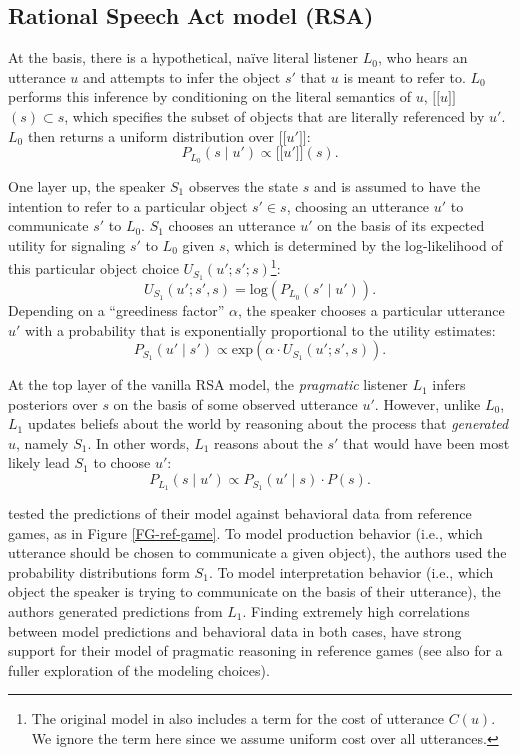 \documentclass[10pt,a4paper]{article}
\newcommand{\sem}[1]{\mbox{$[\![$#1$]\!]$}}
\begin{document}
\subsection{Rational Speech Act model (RSA)}


At the basis, there is a hypothetical, na\"ive literal listener $L_0$, who hears an utterance $u$ and attempts to infer the object $s'$ that $u$ is meant to refer to.
$L_0$ performs this inference by conditioning on the literal semantics of $u$, \sem{$u$}$(s)\subset s$, which specifies the subset of objects that are literally referenced by $u'$. 
$L_0$ then returns a uniform distribution over \sem{$u'$}:
$$P_{L_{0}}(s\mid u') \propto \sem{$u'$}(s).$$

One layer up, the speaker $S_1$ observes the state $s$ and is assumed to have the intention to refer to a particular object $s' \in s$, choosing an utterance $u'$ to communicate $s'$ to $L_0$.
$S_1$ chooses an utterance $u'$ on the basis of its expected utility for signaling $s'$ to $L_0$ given $s$, which is determined by the log-likelihood of this particular object choice $U_{S_1}(u';s';s)$\footnote{The original model in  also includes a term for the cost of utterance $C(u)$. We ignore the term here since we assume uniform cost over all utterances.}:
$$U_{S_{1}}(u';s',s) = \textrm{log}(P_{L_{0}}(s' \mid u')).$$ 
Depending on a ``greediness factor'' $\alpha$, the speaker chooses a particular utterance $u'$ with a probability that is exponentially proportional to the utility estimates: 
$$P_{S_{1}} (u' \mid s') \propto   \textrm{exp}(\alpha \cdot U_{S_{1}} (u';s',s)).$$

At the top layer of the vanilla RSA model, the \emph{pragmatic} listener $L_1$ infers posteriors over $s$ on the basis of some observed utterance $u'$.
However, unlike $L_0$, $L_1$ updates beliefs about the world by reasoning about the process that \emph{generated} $u$, namely $S_1$.
In other words, $L_1$ reasons about the $s'$ that would have been most likely lead $S_1$ to choose $u'$:
$$P_{L_{1}}(s\mid u') \propto P_{S_{1}}(u' \mid s) \cdot P(s).$$

 tested the predictions of their model against behavioral data from reference games, as in Figure \ref{FG-ref-game}.
To model production behavior (i.e., which utterance should be chosen to communicate a given object), the authors used the probability distributions form $S_1$.
To model interpretation behavior (i.e., which object the speaker is trying to communicate on the basis of their utterance), the authors generated predictions from $L_1$.
Finding extremely high correlations between model predictions and behavioral data in both cases, \citeauthor{frankgoodman2012} have strong support for their model of pragmatic reasoning in reference games (see also  for a fuller exploration of the modeling choices).
\end{document}
